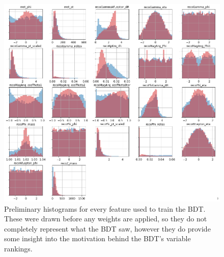 \begin{figure}[htb]
\begin{center}
\includegraphics[width=.95\linewidth]{Dissertation/fig/bdt-training.png}
\end{center}
\caption{Preliminary histograms for every feature used to train the BDT. These were drawn before any weights are applied, so they do not completely represent what the BDT saw, however they do provide some insight into the motivation behind the BDT's variable rankings.}
\label{fig:bdt-training}
\end{figure}